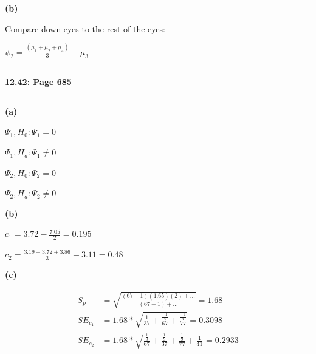\documentclass[11pt]{article}
\newcommand\question[2]{\vspace{.25in}\hrule\textbf{#1: #2}\vspace{.5em}\hrule\vspace{.10in}}
\renewcommand\part[1]{\vspace{.10in}\textbf{(#1)}\par}
\begin{document}
	\part{b}
		Compare down eyes to the rest of the eyes:\par
		$\psi_{2} = \frac{(\mu_{1} + \mu_{2} + \mu_{4})}{3}-\mu_{3}$


\question{12.42}{Page 685}
	\part{a}
		$\Psi_{1}, H_{0}: \Psi_{1} = 0$\par
		$\Psi_{1}, H_{a}: \Psi_{1} \ne 0$\par
		$\Psi_{2}, H_{0}: \Psi_{2} = 0$\par
		$\Psi_{2}, H_{a}: \Psi_{2} \ne 0$\par
	
	\part{b}
		$c_{1} = 3.72 - \frac{7.05}{2} = 0.195$\par
		$c_{2} = \frac{3.19 + 3.72 + 3.86}{3} - 3.11= 0.48$\par	
	
	\part{c}
		\begin{align*}
			S_{p} &= \sqrt{ \frac{ (67-1)(1.65)(2) + ... }{ (67-1) + ... } } = 1.68\\
			SE_{c_{1}} &= 1.68 * \sqrt{\frac{1}{37}+ \frac{\frac{-1}{4}}{67} + \frac{\frac{-1}{4}}{77}} = 0.3098\\
			SE_{c_{2}} &= 1.68 * \sqrt{  \frac{\frac{1}{9}}{67} + \frac{\frac{1}{9}}{37} + \frac{\frac{1}{9}}{77} + \frac{1}{41}} = 0.2933\\
		\end{align*}\par
	
\end{document}
